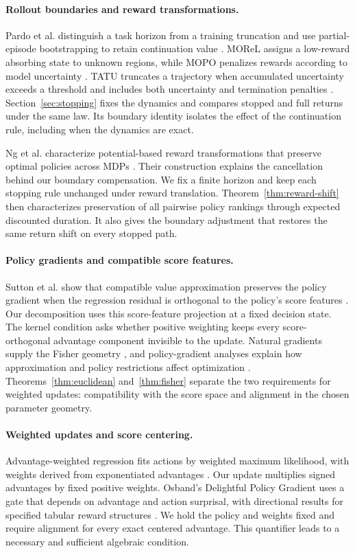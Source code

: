 \paragraph{Rollout boundaries and reward transformations.}
Pardo et al. distinguish a task horizon from a training truncation and use partial-episode bootstrapping to retain continuation value \cite{pardo}. MOReL assigns a low-reward absorbing state to unknown regions, while MOPO penalizes rewards according to model uncertainty \cite{morel,mopo}. TATU truncates a trajectory when accumulated uncertainty exceeds a threshold and includes both uncertainty and termination penalties \cite{tatu}. Section~\ref{sec:stopping} fixes the dynamics and compares stopped and full returns under the same law. Its boundary identity isolates the effect of the continuation rule, including when the dynamics are exact.

Ng et al. characterize potential-based reward transformations that preserve optimal policies across MDPs \cite{ng}. Their construction explains the cancellation behind our boundary compensation. We fix a finite horizon and keep each stopping rule unchanged under reward translation. Theorem~\ref{thm:reward-shift} then characterizes preservation of all pairwise policy rankings through expected discounted duration. It also gives the boundary adjustment that restores the same return shift on every stopped path.

\paragraph{Policy gradients and compatible score features.}
Sutton et al. show that compatible value approximation preserves the policy gradient when the regression residual is orthogonal to the policy's score features \cite{sutton}. Our decomposition uses this score-feature projection at a fixed decision state. The kernel condition asks whether positive weighting keeps every score-orthogonal advantage component invisible to the update. Natural gradients supply the Fisher geometry \cite{kakade}, and policy-gradient analyses explain how approximation and policy restrictions affect optimization \cite{agarwal}. Theorems~\ref{thm:euclidean} and~\ref{thm:fisher} separate the two requirements for weighted updates: compatibility with the score space and alignment in the chosen parameter geometry.

\paragraph{Weighted updates and score centering.}
Advantage-weighted regression fits actions by weighted maximum likelihood, with weights derived from exponentiated advantages \cite{awr}. Our update multiplies signed advantages by fixed positive weights. Osband's Delightful Policy Gradient uses a gate that depends on advantage and action surprisal, with directional results for specified tabular reward structures \cite{osband}. We hold the policy and weights fixed and require alignment for every exact centered advantage. This quantifier leads to a necessary and sufficient algebraic condition.

